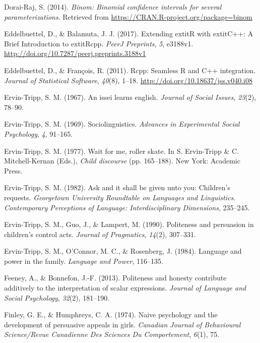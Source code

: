 \documentclass[oneside]{report}
\begin{document}
\hypertarget{ref-R-binom}{}
Dorai-Raj, S. (2014). \emph{Binom: Binomial confidence intervals for
several parameterizations}. Retrieved from
\url{https://CRAN.R-project.org/package=binom}

\hypertarget{ref-R-Rcpp_b}{}
Eddelbuettel, D., \& Balamuta, J. J. (2017). Extending extitR with
extitC++: A Brief Introduction to extitRcpp. \emph{PeerJ Preprints},
\emph{5}, e3188v1. \url{http://doi.org/10.7287/peerj.preprints.3188v1}

\hypertarget{ref-R-Rcpp_a}{}
Eddelbuettel, D., \& François, R. (2011). Rcpp: Seamless R and C++
integration. \emph{Journal of Statistical Software}, \emph{40}(8),
1--18. \url{http://doi.org/10.18637/jss.v040.i08}

\hypertarget{ref-ervin1967}{}
Ervin-Tripp, S. M. (1967). An issei learns english. \emph{Journal of
Social Issues}, \emph{23}(2), 78--90.

\hypertarget{ref-ervin1969}{}
Ervin-Tripp, S. M. (1969). Sociolinguistics. \emph{Advances in
Experimental Social Psychology}, \emph{4}, 91--165.

\hypertarget{ref-ervin1977}{}
Ervin-Tripp, S. M. (1977). Wait for me, roller skate. In S. Ervin-Tripp
\& C. Mitchell-Kernan (Eds.), \emph{Child discourse} (pp. 165--188). New
York: Academic Press.

\hypertarget{ref-ervin1982}{}
Ervin-Tripp, S. M. (1982). Ask and it shall be given unto you:
Children's requests. \emph{Georgetown University Roundtable on Languages
and Linguistics. Contemporary Perceptions of Language: Interdisciplinary
Dimensions}, 235--245.

\hypertarget{ref-ervin1990}{}
Ervin-Tripp, S. M., Guo, J., \& Lampert, M. (1990). Politeness and
persuasion in children's control acts. \emph{Journal of Pragmatics},
\emph{14}(2), 307--331.

\hypertarget{ref-ervin1984}{}
Ervin-Tripp, S. M., O'Connor, M. C., \& Rosenberg, J. (1984). Language
and power in the family. \emph{Language and Power}, 116--135.

\hypertarget{ref-feeney2013}{}
Feeney, A., \& Bonnefon, J.-F. (2013). Politeness and honesty contribute
additively to the interpretation of scalar expressions. \emph{Journal of
Language and Social Psychology}, \emph{32}(2), 181--190.

\hypertarget{ref-finley1974}{}
Finley, G. E., \& Humphreys, C. A. (1974). Naive psychology and the
development of persuasive appeals in girls. \emph{Canadian Journal of
Behavioural Science/Revue Canadienne Des Sciences Du Comportement},
\emph{6}(1), 75.
\end{document}
